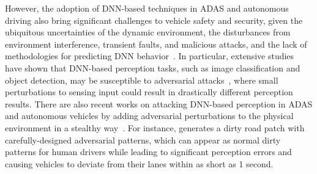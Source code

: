 \documentclass[letterpaper, 10 pt, conference]{ieeeconf}
\newcommand{\alfred}[1]{{{\color{blue} \textbf{(Alfred: #1)}}}}
\begin{document}
However, the adoption of DNN-based techniques in ADAS and autonomous driving also bring significant challenges to vehicle safety and security, given the ubiquitous uncertainties of the dynamic environment, the disturbances from environment interference, transient faults, and malicious attacks, and the lack of methodologies for predicting DNN behavior~\cite{zhu2020know}. In particular, extensive studies have shown that DNN-based perception tasks, such as image classification and object detection, may be susceptible to adversarial attacks~\cite{eykholt2018robust,chen2018shapeshifter}, where small perturbations to sensing input could result in drastically different perception results. There are also recent works on attacking DNN-based perception in ADAS and autonomous vehicles by adding adversarial perturbations to the physical environment in a stealthy way~\cite{zhou2020deep,sato2020hold,song2018physical,eykholt2018robust,sitawarin2018darts}. For instance, \cite{sato2020hold} generates a dirty road patch with carefully-designed adversarial patterns, which can appear as normal dirty patterns for human drivers while leading to significant perception errors and causing vehicles to deviate from their lanes within as short as 1 second. %


\end{document}
